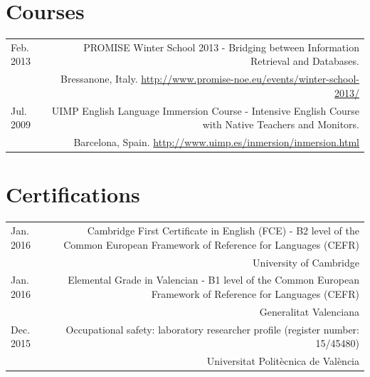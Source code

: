 \documentclass[10pt]{article}
\begin{document}
\section*{Courses}
\begin{tabular}{L!{\VRule}R}
Feb. 2013 & PROMISE Winter School 2013 - Bridging between Information Retrieval and Databases.\\
&\scriptsize{Bressanone, Italy. \url{http://www.promise-noe.eu/events/winter-school-2013/}} \vspace{5pt}\\
 
Jul. 2009 & UIMP English Language Immersion Course - Intensive English Course with Native Teachers and Monitors.\\
&\scriptsize{Barcelona, Spain. \url{http://www.uimp.es/inmersion/inmersion.html}} \vspace{5pt}\\
\end{tabular}

\section*{Certifications}
\begin{tabular}{L!{\VRule}R}
Jan. 2016 & Cambridge First Certificate in English (FCE) - B2 level of the Common European Framework of Reference for Languages (CEFR)\\
&\scriptsize{University of Cambridge} \vspace{5pt}\\
Jan. 2016 & Elemental Grade in Valencian - B1 level of the Common European Framework of Reference for Languages (CEFR)\\
&\scriptsize{Generalitat Valenciana} \vspace{5pt}\\
Dec. 2015 & Occupational safety: laboratory researcher profile (register number: 15/45480)\\
&\scriptsize{Universitat Polit{\`e}cnica de Val{\`e}ncia} \vspace{5pt}\\
\end{tabular}
\end{document}
